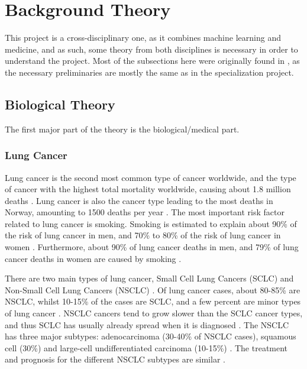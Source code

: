 \chapter{Background Theory}\label{T-B}
\label{cha:TheoryAndBackground}

This project is a cross-disciplinary one, as it combines machine learning and medicine, and as such, some theory from both disciplines is necessary in order to understand the project. Most of the subsections here were originally found in \citet{forprosjekt}, as the necessary preliminaries are mostly the same as in the specialization project.

\section{Biological Theory}
\label{sec:bio_theory}

The first major part of the theory is the biological/medical part.

\subsection{Lung Cancer}
\label{subsec:lung_cancer}

Lung cancer is the second most common type of cancer worldwide, and the type of cancer with the highest total mortality worldwide, causing about 1.8 million deaths \citep{globalkreftforekomst}. Lung cancer is also the cancer type leading to the most deaths in Norway, amounting to 1500 deaths per year \citep{kreftnorge}. The most important risk factor related to lung cancer is smoking. Smoking is estimated to explain about 90\% of the risk of lung cancer in men, and 70\% to 80\% of the risk of lung cancer in women \citep{roykingrisiko}. Furthermore, about 90\% of lung cancer deaths in men, and 79\% of lung cancer deaths in women are caused by smoking \citep{roykingdod}.

There are two main types of lung cancer, Small Cell Lung Cancers (SCLC) and Non-Small Cell Lung Cancers (NSCLC) \citep{nsclcvsclc}. Of lung cancer cases, about 80-85\% are NSCLC, whilst 10-15\% of the cases are SCLC, and a few percent are minor types of lung cancer \citep{nsclcvsclc2}. NSCLC cancers tend to grow slower than the SCLC cancer types, and thus SCLC has usually already spread when it is diagnosed \citep{nsclcvsclc2}. The NSCLC has three major subtypes: adenocarcinoma (30-40\% of NSCLC cases), squamous cell (30\%) and large-cell undifferentiated carcinoma (10-15\%) \citep{nsclcvsclc}. The treatment and prognosis for the different NSCLC subtypes are similar \citep{nsclcvsclc2}.

